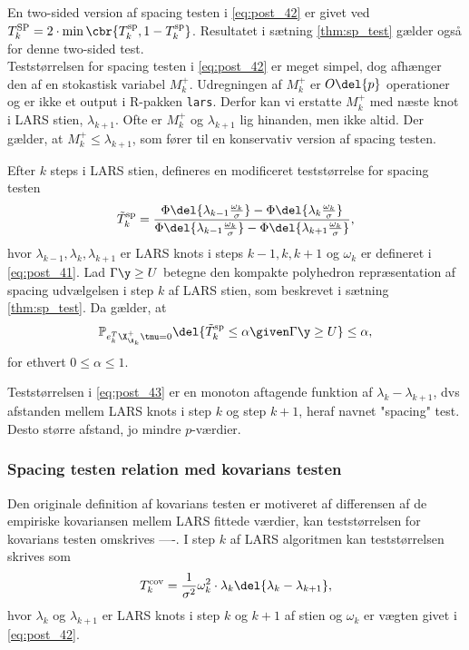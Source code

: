 En two-sided version af spacing testen i \eqref{eq:post_42} er givet ved \(T_k^\text{SP} = 2 \cdot \min \cbr{T_k^\text{sp}, 1 - T_k^\text{sp}}\).
Resultatet i sætning \ref{thm:sp_test} gælder også for denne two-sided test. \\[3mm]
%
Teststørrelsen for spacing testen i \eqref{eq:post_42} er meget simpel, dog afhænger den af en stokastisk variabel \(M_k^+\).
Udregningen af \(M_k^+\) er \(O\del{p}\) operationer og er ikke et output i R-pakken \texttt{lars}.
Derfor kan vi erstatte \(M_k^+\) med næste knot i LARS stien, \(\lambda_{k+1}\).
Ofte er \(M_k^+\) og \(\lambda_{k+1}\) lig hinanden, men ikke altid.
Der gælder, at \(M_k^+ \leq \lambda_{k+1}\), som fører til en konservativ version af spacing testen.
%
\begin{thm}
Efter \(k\) steps i LARS stien, defineres en modificeret teststørrelse for spacing testen
\begin{align}
\tilde{T}_k^\text{sp}= \frac{\Phi \del{\lambda_{k-1} \frac{\omega_k}{\sigma}} - \Phi \del{\lambda_{k} \frac{\omega_k}{\sigma}}}{\Phi \del{\lambda_{k-1} \frac{\omega_k}{\sigma}} - \Phi \del{\lambda_{k+1} \frac{\omega_k}{\sigma}}}, \label{eq:post_43}
\end{align}
hvor \(\lambda_{k-1}, \lambda_k, \lambda_{k+1}\) er LARS knots i steps \(k-1, k, k+1\) og \(\omega_k\) er defineret i \eqref{eq:post_41}.
Lad \(\Gamma \y \geq U\) betegne den kompakte polyhedron repræsentation af spacing udvælgelsen i step \(k\) af LARS stien, som beskrevet i sætning \ref{thm:sp_test}.
Da gælder, at
\begin{align*}
\mathbb{P}_{e_k^T \X_{\A_k}^+ \tmu = 0} \del{\tilde{T}_k^\text{sp} \leq \alpha \given \Gamma \y \geq U} \leq \alpha,
\end{align*}
for ethvert \(0 \leq \alpha \leq 1\).
\end{thm}
%
Teststørrelsen i \eqref{eq:post_43} er en monoton aftagende funktion af \(\lambda_k - \lambda_{k+1}\), dvs afstanden mellem LARS knots i step \(k\) og step \(k+1\), heraf navnet "spacing" test.
Desto større afstand, jo mindre \(p\)-værdier.

\subsubsection{Spacing testen relation med kovarians testen}
Den originale definition af kovarians testen er motiveret af differensen af de empiriske kovariansen mellem LARS fittede værdier, kan teststørrelsen for kovarians testen omskrives ----.
I step \(k\) af LARS algoritmen kan teststørrelsen skrives som
\begin{align}
T_k^\text{cov} = \frac{1}{\sigma^2} \omega_k^2 \cdot \lambda_k \del{\lambda_k - \lambda_{k+1}}, \label{eq:post_44}
\end{align}
hvor \(\lambda_k\) og \(\lambda_{k+1}\) er LARS knots i step \(k\) og \(k+1\) af stien og \(\omega_k\) er vægten givet i \eqref{eq:post_42}.


